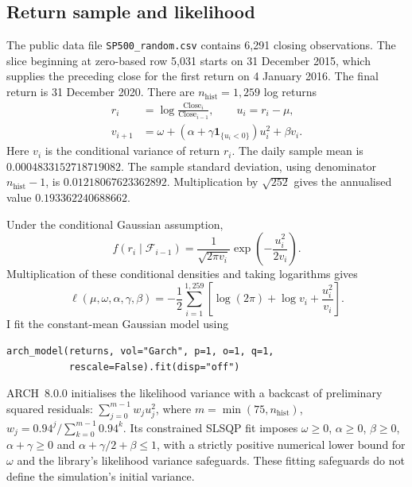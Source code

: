 \documentclass[11pt,a4paper]{article}
\newcommand{\F}{\mathcal F}
\newcommand{\ind}{\mathbf 1}
\theoremstyle{remark}
\begin{document}
\subsection{Return sample and likelihood}
The public data file \texttt{SP500\_random.csv} contains 6,291 closing observations. The slice beginning at zero-based row 5,031 starts on 31 December 2015, which supplies the preceding close for the first return on 4 January 2016. The final return is 31 December 2020. There are $n_{\mathrm{hist}}=1,259$ log returns
\begin{equation}
\begin{aligned}
 r_i&=\log\frac{\mathrm{Close}_i}{\mathrm{Close}_{i-1}},\qquad u_i=r_i-\mu,\\
 v_{i+1}&=\omega+(\alpha+\gamma\ind_{\{u_i<0\}})u_i^2+\beta v_i.
\end{aligned}
 \label{eq:likelihoodstate}
\end{equation}
Here $v_i$ is the conditional variance of return $r_i$. The daily sample mean is $0.0004833152718719082$. The sample standard deviation, using denominator $n_{\mathrm{hist}}-1$, is $0.01218067623362892$. Multiplication by $\sqrt{252}$ gives the annualised value $0.193362240688662$.

Under the conditional Gaussian assumption,
\begin{equation}
 f(r_i\mid\F_{i-1})=\frac{1}{\sqrt{2\pi v_i}}
       \exp\!\left(-\frac{u_i^2}{2v_i}\right).
\end{equation}
Multiplication of these conditional densities and taking logarithms gives
\begin{equation}
 \ell(\mu,\omega,\alpha,\gamma,\beta)
 =-\frac12\sum_{i=1}^{1,259}
       \left[\log(2\pi)+\log v_i+\frac{u_i^2}{v_i}\right].
 \label{eq:likelihood}
\end{equation}
I fit the constant-mean Gaussian model using
\begin{verbatim}
arch_model(returns, vol="Garch", p=1, o=1, q=1,
           rescale=False).fit(disp="off")
\end{verbatim} ARCH~8.0.0 initialises the likelihood variance with a backcast of preliminary squared residuals: $\sum_{j=0}^{m-1}w_ju_j^2$, where $m=\min(75,n_{\mathrm{hist}})$, $w_j=0.94^j/\sum_{k=0}^{m-1}0.94^k$. Its constrained SLSQP fit imposes $\omega\geq0$, $\alpha\geq0$, $\beta\geq0$, $\alpha+\gamma\geq0$ and $\alpha+\gamma/2+\beta\leq1$, with a strictly positive numerical lower bound for $\omega$ and the library's likelihood variance safeguards. These fitting safeguards do not define the simulation's initial variance.
\end{document}
